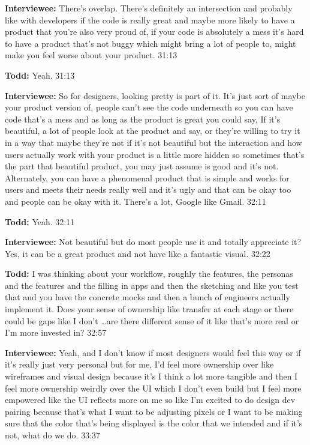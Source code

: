 \textbf{Interviewee:} There's overlap.  There's definitely an intersection and probably like with developers if the code is really great and maybe more likely to have a product that you're also very proud of, if your code is absolutely a mess it's hard to have a product that's not buggy which might bring a lot of people to, might make you feel worse about your product.  31:13

\textbf{Todd:} Yeah.  31:13

\textbf{Interviewee:} So for designers, looking pretty is part of it.  It's just sort of maybe your product version of, people can't see the code underneath so you can have code that's a mess and as long as the product is great you could say,   If it's beautiful, a lot of people look at the product and say,  or they're willing to try it in a way that maybe they're not if it's not beautiful but the interaction and how users actually work with your product is a little more hidden so sometimes that's the part that beautiful product, you may just assume is good and it's not.  Alternately, you can have a phenomenal product that is simple and works for users and meets their needs really well and it's ugly and that can be okay too and people can be okay with it.  There's a lot, Google like Gmail.  32:11

\textbf{Todd:} Yeah.  32:11

\textbf{Interviewee:} Not beautiful but do most people use it and totally appreciate it?  Yes, it can be a great product and not have like a fantastic visual.  32:22

\textbf{Todd:} I was thinking about your workflow, roughly the features, the personas and the features and the filling in apps and then the sketching and like you test that and you have the concrete mocks and then a bunch of engineers actually implement it.  Does your sense of ownership like transfer at each stage or there could be gaps like I don't \ldots are there different sense of it like that's more real or I'm more invested in?  32:57

\textbf{Interviewee:} Yeah, and I don't know if most designers would feel this way or if it's really just very personal but for me, I'd feel more ownership over like wireframes and visual design because it's I think a lot more tangible and then I feel more ownership weirdly over the UI which I don't even build but I feel more empowered like the UI reflects more on me so like I'm excited to do design dev pairing because that's what I want to be adjusting pixels or I want to be making sure that the color that's being displayed is the color that we intended and if it's not, what do we do.  33:37

